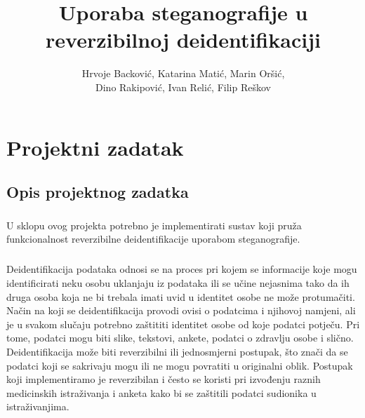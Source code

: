 \documentclass[times, utf8, seminar]{fer}
\begin{document}
\nocite{*}
\title{Uporaba steganografije u reverzibilnoj deidentifikaciji}

\author{	
	Hrvoje Backović,
	Katarina Matić,
	Marin Oršić,\\
	Dino Rakipović,
	Ivan Relić,
	Filip Reškov	}



\maketitle

\tableofcontents

\chapter{Projektni zadatak}
\section{Opis projektnog zadatka}

\paragraph{}
U sklopu ovog projekta potrebno je implementirati sustav koji pruža funkcionalnost reverzibilne deidentifikacije uporabom steganografije.
\paragraph{}
Deidentifikacija podataka odnosi se na proces pri kojem se informacije koje mogu identificirati neku osobu uklanjaju iz podataka ili se učine nejasnima tako da ih druga osoba koja ne bi trebala imati uvid u identitet osobe ne može protumačiti. Način na koji se deidentifikacija provodi ovisi o podatcima i njihovoj namjeni, ali je u svakom slučaju potrebno zaštititi identitet osobe od koje podatci potječu. Pri tome, podatci mogu biti slike, tekstovi, ankete, podatci o zdravlju osobe i slično. Deidentifikacija može biti reverzibilni ili jednosmjerni postupak, što znači  da se podatci koji se sakrivaju mogu ili ne mogu povratiti u originalni oblik. Postupak koji implementiramo je reverzibilan i često se koristi pri izvođenju raznih medicinskih istraživanja i anketa kako bi se zaštitili podatci sudionika u istraživanjima.
\end{document}
